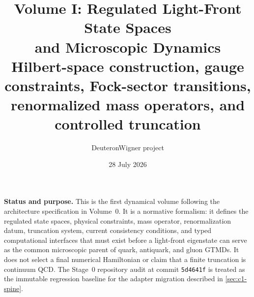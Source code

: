 \documentclass[11pt]{article}
\title{\vspace{-1.0cm}
{\color{navy}\bfseries Volume I: Regulated Light-Front State Spaces\\[2mm]
and Microscopic Dynamics}\\[4mm]
\large Hilbert-space construction, gauge constraints, Fock-sector transitions,\\
renormalized mass operators, and controlled truncation}
\author{DeuteronWigner project}
\date{28 July 2026}
\begin{document}
\maketitle

\begin{center}
\begin{minipage}{0.94\textwidth}
\colorbox{softblue}{\parbox{0.96\textwidth}{
\textbf{Status and purpose.}
This is the first dynamical volume following the architecture specification
in Volume~0.  It is a normative formalism: it defines the regulated state
spaces, physical constraints, mass operator, renormalization datum,
truncation system, current consistency conditions, and typed computational
interfaces that must exist before a light-front eigenstate can serve as the
common microscopic parent of quark, antiquark, and gluon GTMDs.  It does not
select a final numerical Hamiltonian or claim that a finite truncation is
continuum QCD.  The Stage~0 repository audit at commit
\texttt{5d4641f} is treated as the immutable regression baseline for the
adapter migration described in \cref{sec:c1-spine}.
}}
\end{minipage}
\end{center}
\end{document}
